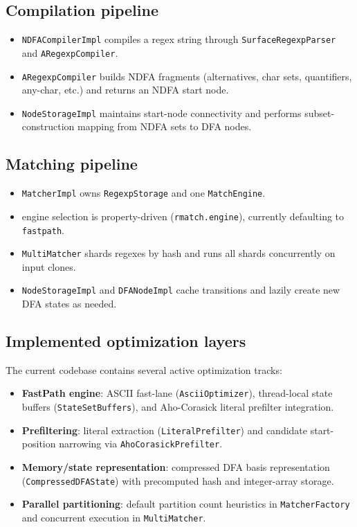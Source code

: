\documentclass[11pt]{article}
\begin{document}
\subsection{Compilation pipeline}
\begin{itemize}
  \item \texttt{NDFACompilerImpl} compiles a regex string through \texttt{SurfaceRegexpParser} and \texttt{ARegexpCompiler}.
  \item \texttt{ARegexpCompiler} builds NDFA fragments (alternatives, char sets, quantifiers, any-char, etc.) and returns an NDFA start node.
  \item \texttt{NodeStorageImpl} maintains start-node connectivity and performs subset-construction mapping from NDFA sets to DFA nodes.
\end{itemize}

\subsection{Matching pipeline}
\begin{itemize}
  \item \texttt{MatcherImpl} owns \texttt{RegexpStorage} and one \texttt{MatchEngine}.
  \item engine selection is property-driven (\texttt{rmatch.engine}), currently defaulting to \texttt{fastpath}.
  \item \texttt{MultiMatcher} shards regexes by hash and runs all shards concurrently on input clones.
  \item \texttt{NodeStorageImpl} and \texttt{DFANodeImpl} cache transitions and lazily create new DFA states as needed.
\end{itemize}

\subsection{Implemented optimization layers}
The current codebase contains several active optimization tracks:
\begin{itemize}
  \item \textbf{FastPath engine}: ASCII fast-lane (\texttt{AsciiOptimizer}), thread-local state buffers (\texttt{StateSetBuffers}), and Aho-Corasick literal prefilter integration.
  \item \textbf{Prefiltering}: literal extraction (\texttt{LiteralPrefilter}) and candidate start-position narrowing via \texttt{AhoCorasickPrefilter}.
  \item \textbf{Memory/state representation}: compressed DFA basis representation (\texttt{CompressedDFAState}) with precomputed hash and integer-array storage.
  \item \textbf{Parallel partitioning}: default partition count heuristics in \texttt{MatcherFactory} and concurrent execution in \texttt{MultiMatcher}.
\end{itemize}
\end{document}
